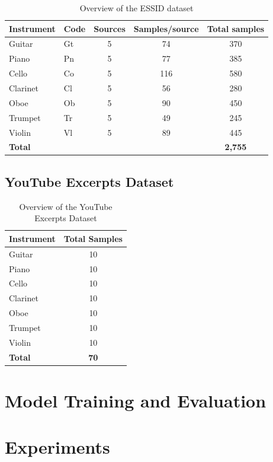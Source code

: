 \begin{table}[H]
  \centering
  \caption{Overview of the ESSID dataset}
  \label{tab:essid}
  \begin{tabular}{llccc}
    \toprule
    Instrument & Code & Sources & Samples/source & Total samples \\
    \midrule
    Guitar     & Gt   & 5       & 74              & 370           \\
    Piano      & Pn   & 5       & 77              & 385           \\
    Cello      & Co   & 5       & 116             & 580           \\
    Clarinet   & Cl   & 5       & 56              & 280           \\
    Oboe       & Ob   & 5       & 90              & 450           \\
    Trumpet    & Tr   & 5       & 49              & 245           \\
    Violin     & Vl   & 5       & 89              & 445           \\
    \midrule
    \textbf{Total} & & & & \textbf{2,755} \\
    \bottomrule
  \end{tabular}
\end{table}

\subsection{YouTube Excerpts Dataset}

\begin{table}[H]
  \centering
  \caption{Overview of the YouTube Excerpts Dataset}
  \label{tab:youtube}
  \begin{tabular}{lc}
    \toprule
    Instrument & Total Samples \\
    \midrule
    Guitar     & 10            \\
    Piano      & 10            \\
    Cello      & 10            \\
    Clarinet   & 10            \\
    Oboe       & 10            \\
    Trumpet    & 10            \\
    Violin     & 10            \\
    \midrule
    \textbf{Total} & \textbf{70} \\
    \bottomrule
  \end{tabular}
\end{table}

\section{Model Training and Evaluation}


\section{Experiments}

